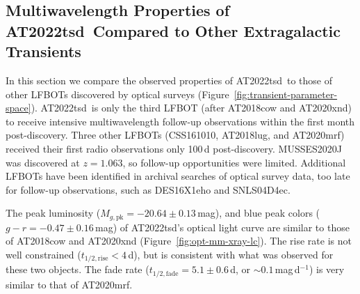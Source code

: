 \documentclass{nature_plusfigure}
\newcommand{\at}{AT2022tsd}
\begin{document}
\begin{methods}
\section{Multiwavelength Properties of \at\ Compared to Other Extragalactic Transients}
\label{sec:multiwavelength-properties}

In this section we compare the observed properties of \at\ to those of other LFBOTs discovered by optical surveys (Figure~\ref{fig:transient-parameter-space}).
\at\ is only the third LFBOT (after AT2018cow\cite{Prentice2018,Perley2019} and AT2020xnd\cite{Perley2021}) to receive intensive multiwavelength follow-up observations within the first month post-discovery.
Three other LFBOTs (CSS161010\cite{Coppejans2020}, AT2018lug\cite{Ho2020_Koala}, and AT2020mrf\cite{Yao2022}) received their first radio observations only 100\,d post-discovery. MUSSES2020J\cite{Jiang2022} was discovered at $z=1.063$, so follow-up opportunities were limited.
Additional LFBOTs have been identified in archival searches of optical survey data, too late for follow-up observations, such as DES16X1eho\cite{Pursiainen2018} and SNLS04D4ec\cite{Arcavi2016}. 

The peak luminosity ($M_{g,\mathrm{pk}}=-20.64\pm0.13$\,mag), and blue peak colors ($g-r=-0.47\pm0.16$\,mag) of \at's optical light curve are similar to those of AT2018cow\cite{Prentice2018,Perley2019} and AT2020xnd\cite{Perley2021} (Figure~\ref{fig:opt-mm-xray-lc}).
The rise rate is not well constrained ($t_{1/2,\mathrm{rise}}<4\,$d), but is consistent with what was observed for these two objects.
The fade rate ($t_{1/2,\mathrm{fade}}=5.1\pm0.6$\,d, or $\sim0.1\,$mag\,d$^{-1}$) is very similar to that of AT2020mrf\cite{Yao2022}.



\end{methods}
\end{document}
